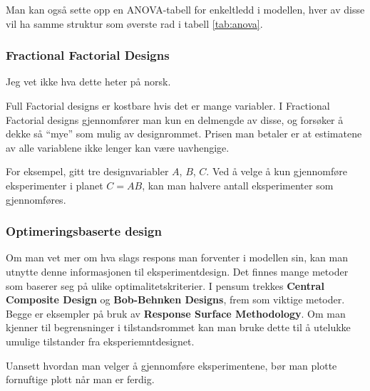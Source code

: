 Man kan også sette opp en ANOVA-tabell for enkeltledd i modellen, hver av disse vil ha samme struktur som øverste rad i tabell \ref{tab:anova}.

\subsubsection{Fractional Factorial Designs}
Jeg vet ikke hva dette heter på norsk.

Full Factorial designs er kostbare hvis det er mange variabler. I Fractional Factorial designs gjennomfører man kun en delmengde av disse, og forsøker å dekke så ``mye'' som mulig av designrommet. Prisen man betaler er at estimatene av alle variablene ikke lenger kan være uavhengige.

For eksempel, gitt tre designvariabler $A$, $B$, $C$. Ved å velge å kun gjennomføre eksperimenter i planet $C = AB$, kan man halvere antall eksperimenter som gjennomføres.

\subsubsection{Optimeringsbaserte design}
Om man vet mer om hva slags respons man forventer i modellen sin, kan man utnytte denne informasjonen til eksperimentdesign. Det finnes mange metoder som baserer seg på ulike optimalitetskriterier. I pensum trekkes \textbf{Central Composite Design} og \textbf{Bob-Behnken Designs}, frem som viktige metoder. Begge er eksempler på bruk av \textbf{Response Surface Methodology}. Om man kjenner til begrensninger i tilstandsrommet kan man bruke dette til å utelukke umulige tilstander fra eksperiemntdesignet.

Uansett hvordan man velger å gjennomføre eksperimentene, bør man plotte fornuftige plott når man er ferdig. 


